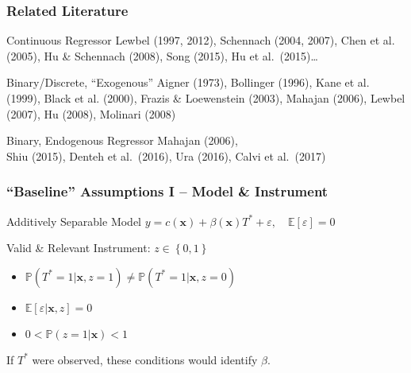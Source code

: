 \documentclass{beamer}
\begin{document}
\begin{frame}
  \frametitle{Related Literature}
 
  \begin{block}{Continuous Regressor}
    \small
  Lewbel (1997, 2012), Schennach (2004, 2007), Chen et al. (2005), Hu \& Schennach (2008), Song (2015), Hu et al.\ (2015)\ldots 
  \end{block}

  \begin{block}{Binary/Discrete, ``Exogenous''} 
    \small
   Aigner (1973), Bollinger (1996), Kane et al. (1999), Black et al. (2000), Frazis \& Loewenstein (2003), Mahajan (2006), Lewbel (2007), Hu (2008), Molinari (2008)
  \end{block}

  \begin{block}{Binary, Endogenous Regressor}
    \alert{Mahajan (2006)},\\ \small Shiu (2015), Denteh et al.\ (2016), Ura (2016), Calvi et al.\ (2017)
  \end{block}


\end{frame}
\begin{frame}
  \frametitle{``Baseline'' Assumptions I -- Model \& Instrument}

  \begin{block}{Additively Separable Model}
    $y = c(\mathbf{x}) + \beta(\mathbf{x}) T^* + \varepsilon, \quad \mathbb{E}[ \varepsilon] = 0$ 
  \end{block}

  \begin{block}{Valid \& Relevant Instrument: $z \in \left\{ 0,1 \right\}$}
    \begin{itemize}
      \item $\mathbb{P}(T^*=1|\mathbf{x},z=1) \neq \mathbb{P}(T^*=1|\mathbf{x},z=0)$
      \item $\mathbb{E}[\varepsilon|\mathbf{x},z] = 0$
      \item $0 < \mathbb{P}(z=1|\mathbf{x}) < 1$
    \end{itemize}
  \end{block}

  \begin{alertblock}{If $T^*$ were observed, these conditions would identify $\beta$.}
  \end{alertblock}
\end{frame}
\end{document}
